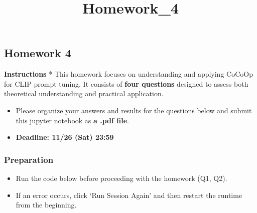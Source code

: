 \documentclass[11pt]{article}
\title{Homework\_4}
\providecommand{\tightlist}{%
      \setlength{\itemsep}{0pt}\setlength{\parskip}{0pt}}
\begin{document}
    
    \maketitle
    
    

    
    \subsection*{\texorpdfstring{\textbf{Homework
4}}{Homework 4}}\label{homework-4}

\textbf{Instructions} * This homework focuses on understanding and
applying CoCoOp for CLIP prompt tuning. It consists of \textbf{four
questions} designed to assess both theoretical understanding and
practical application.

\begin{itemize}
\item
  Please organize your answers and results for the questions below and
  submit this jupyter notebook as \textbf{a .pdf file}.
\item
  \textbf{Deadline: 11/26 (Sat) 23:59}
\end{itemize}

    \subsubsection*{\texorpdfstring{\textbf{Preparation}}{Preparation}}\label{preparation}

\begin{itemize}
\tightlist
\item
  Run the code below before proceeding with the homework (Q1, Q2).
\item
  If an error occurs, click `Run Session Again' and then restart the
  runtime from the beginning.
\end{itemize}
\end{document}
